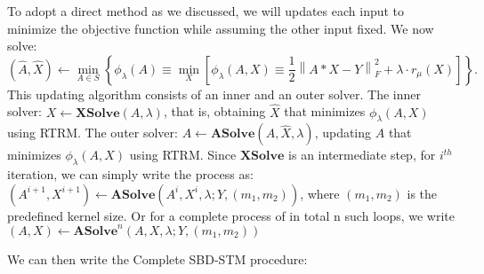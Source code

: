 To adopt a direct method as we discussed, we will updates each input to minimize the objective function while assuming the other input fixed. We now solve: 
\begin{equation}
	\label{sbdalgorithm}
	(\hat{A}, \hat{X}) \leftarrow \min_{{A} \in {S}} \left\{ 
	\phi_{\lambda}({A}) \equiv \min_{X} \left[ 
	\phi_{\lambda}({A}, {X}) \equiv \frac{1}{2} \left\| {A} * {X} - {Y} \right\|_F^2 
	+ \lambda \cdot r_{\mu}({X}) 
	\right] 
	\right\}.
\end{equation}
This updating algorithm consists of an inner and an outer solver. The inner solver: $X \leftarrow \mathbf{XSolve}(A, \lambda)$, that is, obtaining $\hat{X}$ that minimizes $\phi_{\lambda}(A,X)$ using \ac{RTRM}. The outer solver: $A \leftarrow \mathbf{ASolve}(A, \hat{X}, \lambda)$, updating $A$ that minimizes $\phi_{\lambda}(A,X)$ using \ac{RTRM}. Since $\mathbf{XSolve}$ is an intermediate step, for $i^{th}$ iteration, we can simply write the process as: $(A^{i+1}, X^{i+1}) \leftarrow \mathbf{ASolve}(A^{i}, X^{i}, \lambda; Y,(m_1,m_2))$, where $(m_1,m_2)$ is the predefined kernel size. Or for a complete process of in total n such loops, we write $(A, X) \leftarrow \mathbf{ASolve}^n(A, X, \lambda; Y,(m_1,m_2))$

We can then write the Complete SBD-STM procedure: 


